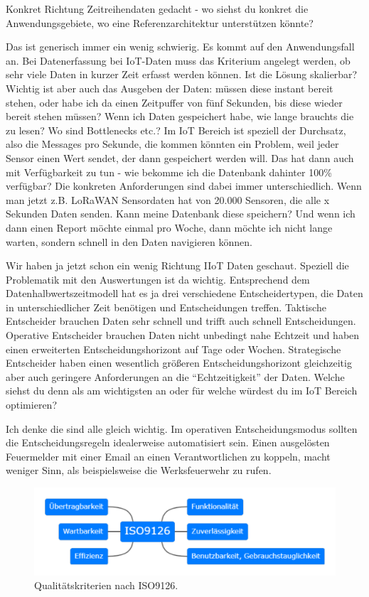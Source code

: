 \LF Konkret Richtung Zeitreihendaten gedacht - wo siehst du konkret die Anwendungsgebiete, wo eine Referenzarchitektur unterstützen könnte?

\RB Das ist generisch immer ein wenig schwierig. Es kommt auf den Anwendungsfall an. Bei Datenerfassung bei \ac{IoT}-Daten muss das Kriterium angelegt werden, ob sehr viele Daten in kurzer Zeit erfasst werden können. Ist die Lösung skalierbar? Wichtig ist aber auch das Ausgeben der Daten: müssen diese instant bereit stehen, oder habe ich da einen Zeitpuffer von fünf Sekunden, bis diese wieder bereit stehen müssen? Wenn ich Daten gespeichert habe, wie lange brauchts die zu lesen? Wo sind Bottlenecks etc.? Im \ac{IoT} Bereich ist speziell der Durchsatz, also die Messages pro Sekunde, die kommen könnten ein Problem, weil jeder Sensor einen Wert sendet, der dann gespeichert werden will. Das hat dann auch mit Verfügbarkeit zu tun - wie bekomme ich die Datenbank dahinter 100\% verfügbar? Die konkreten Anforderungen sind dabei immer unterschiedlich. Wenn man jetzt z.B. \ac{LoRaWAN} Sensordaten hat von 20.000 Sensoren, die alle x Sekunden Daten senden. Kann meine Datenbank diese speichern? Und wenn ich dann einen Report möchte einmal pro Woche, dann möchte ich nicht lange warten, sondern schnell in den Daten navigieren können.

\LF Wir haben ja jetzt schon ein wenig Richtung \ac{IIoT} Daten geschaut. Speziell die Problematik mit den Auswertungen ist da wichtig. Entsprechend dem Datenhalbwertszeitmodell hat es ja drei verschiedene Entscheidertypen, die Daten in unterschiedlicher Zeit benötigen und Entscheidungen treffen. Taktische Entscheider brauchen Daten sehr schnell und trifft auch schnell Entscheidungen. Operative Entscheider brauchen Daten nicht unbedingt nahe Echtzeit und haben einen erweiterten Entscheidungshorizont auf Tage oder Wochen. Strategische Entscheider haben einen wesentlich größeren Entscheidungshorizont gleichzeitig aber auch geringere Anforderungen an die \enquote{Echtzeitigkeit} der Daten. Welche siehst du denn als am wichtigsten an oder für welche würdest du im \ac{IoT} Bereich optimieren?

\RB Ich denke die sind alle gleich wichtig. Im operativen Entscheidungsmodus sollten die Entscheidungsregeln idealerweise automatisiert sein. Einen ausgelösten Feuermelder mit einer Email an einen Verantwortlichen zu koppeln, macht weniger Sinn, als beispielsweise die Werksfeuerwehr zu rufen.


\begin{figure}[H]
\centering
\includegraphics[width=\textwidth]{graphics/ISO-9126.pdf}
\caption[Qualitätskriterien nach ISO9126]{Qualitätskriterien nach ISO9126.\footnotemark}
\label{abb:ISO9126}
\end{figure}

